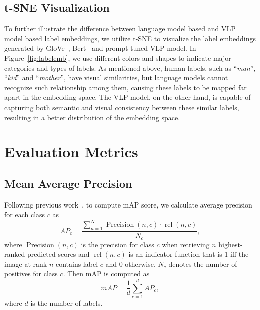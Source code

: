\documentclass[letterpaper]{article} %
\begin{document}
\subsection{t-SNE Visualization}
To further illustrate the difference between language model based and VLP model based label embeddings, we utilize t-SNE to visualize the label embeddings generated by GloVe~\cite{glove}, Bert~\cite{devlin2018bert} and prompt-tuned VLP model.
In Figure~\ref{fig:labelemb}, we use different colors and shapes to indicate major categories and types of labels.
As mentioned above, human labels, such as ``\textit{man}'', ``\textit{kid}'' and ``\textit{mother}'', have visual similarities, but language models cannot recognize such relationship among them, causing these labels to be mapped far apart in the embedding space.
The VLP model, on the other hand, is capable of capturing both semantic and visual consistency between these similar labels, resulting in a better distribution of the embedding space.


\section{Evaluation Metrics}
\subsection{Mean Average Precision}
Following previous work~\cite{Veit_2017_CVPR}, to compute mAP score, we calculate average precision for each class $c$ as
\begin{equation}
A P_{c}=\frac{\sum_{n=1}^{N} \operatorname{Precision}(n, c) \cdot \operatorname{rel}(n, c)}{N_{c}},
\end{equation}
where $\operatorname{Precision}(n, c)$ is the precision for class $c$ when retrieving $n$ highest-ranked predicted scores and $\operatorname{rel}(n, c)$ is an indicator function that is 1 iff the image at rank $n$ contains label $c$ and 0 otherwise.
$N_{c}$ denotes the number of positives for class $c$.
Then mAP is computed as 
\begin{equation}
m A P=\frac{1}{d} \sum_{c=1}^{d} A P_{c},
\end{equation}
where $d$ is the number of labels.
\end{document}
